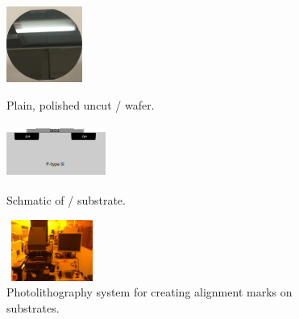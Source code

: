 \begin{figure}[ht]
	\centering
	\begin{minipage}[b]{0.25\linewidth}
		\centering
		\includegraphics[height=2.5cm,width=2.5cm]{figs/experimental/plain_wafer}
		\caption[Plain wafer]{Plain, polished uncut / wafer.}
		\label{fig:plain_wafer}
	\end{minipage}
	\qquad
	\begin{minipage}[b]{0.25\linewidth}
		\centering
		\includegraphics[height=1.75cm,width=3.25cm]{figs/experimental/si_sio2_diagram}
		\caption[Schematic of / substrate]{Schmatic of / substrate.}
		\label{fig:si_sio2_diagram}
	\end{minipage}
	\qquad
	\begin{minipage}[b]{0.25\linewidth}
		\centering
		\includegraphics[height=2cm,width=3cm]{figs/experimental/photolithography_bay}
		\caption[Photolithography system]{Photolithography system for creating alignment marks on substrates.}
		\label{fig:photolithography_bay}
	\end{minipage}
\end{figure}
~

